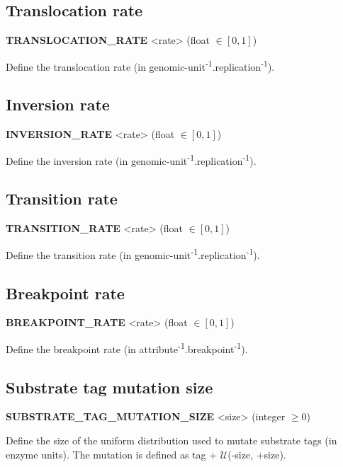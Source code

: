 
\subsection{Translocation rate}
\begin{center}
{\bf TRANSLOCATION\_RATE} <rate> (float $\in [0, 1]$)
\end{center}
Define the translocation rate (in genomic-unit\textsuperscript{-1}.replication\textsuperscript{-1}).


\subsection{Inversion rate}
\begin{center}
{\bf INVERSION\_RATE} <rate> (float $\in [0, 1]$)
\end{center}
Define the inversion rate (in genomic-unit\textsuperscript{-1}.replication\textsuperscript{-1}).


\subsection{Transition rate}
\begin{center}
{\bf TRANSITION\_RATE} <rate> (float $\in [0, 1]$)
\end{center}
Define the transition rate  (in genomic-unit\textsuperscript{-1}.replication\textsuperscript{-1}).


\subsection{Breakpoint rate}
\begin{center}
{\bf BREAKPOINT\_RATE} <rate> (float $\in [0, 1]$)
\end{center}
Define the breakpoint rate  (in attribute\textsuperscript{-1}.breakpoint\textsuperscript{-1}).


\subsection{Substrate tag mutation size}
\begin{center}
{\bf SUBSTRATE\_TAG\_MUTATION\_SIZE} <size> (integer $\ge 0$)
\end{center}
Define the size of the uniform distribution used to mutate substrate tags (in enzyme units). The mutation is defined as tag + $\mathcal{U}$(-size, +size).

